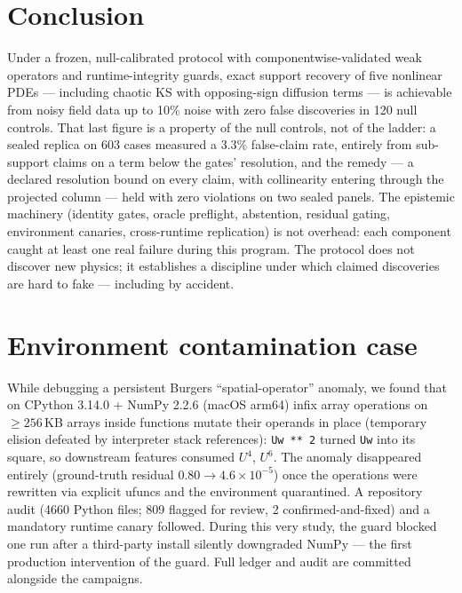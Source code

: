\documentclass[11pt]{article}
\begin{document}
\section{Conclusion}
Under a frozen, null-calibrated protocol with componentwise-validated weak
operators and runtime-integrity guards, exact support recovery of five
nonlinear PDEs --- including chaotic KS with opposing-sign diffusion terms
--- is achievable from noisy field data up to 10\% noise with zero false
discoveries in 120 null controls. That last figure is a property of
the null controls, not of the ladder: a sealed replica on 603 cases measured a
3.3\% false-claim rate, entirely from sub-support claims on a term
below the gates' resolution, and the remedy --- a declared resolution bound on
every claim, with collinearity entering through the projected column --- held with zero
violations on two sealed panels. The epistemic machinery (identity
gates, oracle preflight, abstention, residual gating, environment canaries,
cross-runtime replication) is not overhead: each component caught at least
one real failure during this program. The protocol does not discover new
physics; it establishes a discipline under which claimed discoveries are
hard to fake --- including by accident.

\appendix

\section{Environment contamination case}
\label{app:elision}
While debugging a persistent Burgers ``spatial-operator'' anomaly, we found
that on CPython 3.14.0 + NumPy 2.2.6 (macOS arm64) infix array operations on
$\geq 256$\,KB arrays inside functions mutate their operands in place
(temporary elision defeated by interpreter stack references):
\texttt{Uw ** 2} turned \texttt{Uw} into its square, so downstream features
consumed $U^4$, $U^6$. The anomaly disappeared entirely (ground-truth
residual $0.80 \to 4.6 \times 10^{-5}$) once the operations were rewritten
via explicit ufuncs and the environment quarantined. A repository audit
(4660 Python files; 809 flagged for review,
2 confirmed-and-fixed) and a mandatory runtime canary followed.
During this very study, the guard blocked one run after a third-party
install silently downgraded NumPy --- the first production intervention of
the guard. Full ledger and audit are committed alongside the campaigns.
\end{document}
